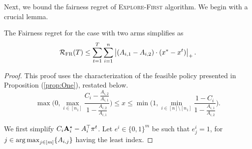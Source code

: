 Next, we bound the fairness regret of \textsc{Explore-First} algorithm. We begin with a crucial lemma.
\begin{lemma}\label{fairness-reform}
The Fairness regret for the case with two arms simplifies as \begin{equation}
\mathcal{R}_\textsc{FR}(T) \leq \sum_{t=1}^T\sum_{i=1}^n \left|(A_{i,1}-A_{i,2})\cdot (x^*-x^t)\right|_+.
\end{equation}
\end{lemma}
\begin{proof}
This proof uses the characterization of the feasible policy presented in Proposition (\ref{prop:One}), restated below.
\begin{equation}
    \max \Bigg( 0,  \max_{i \in [n_1]}\frac{C_i - \frac{A_{i,2}}{A_{i,1}}}{ 1 - \frac{A_{i,2}}{A_{i,1}}} \Bigg) \leq x \leq \min \Bigg( 1, \min_{i \in [n] \setminus [n_1]} \frac{1 - C_i}{ 1 - \frac{A_{i,1}}{A_{i,2}}} \Bigg).
    \label{feasible-x}
\end{equation}

We first simplify $C_i\mathbf{A}^{\star}_i-A_i^\top \pi^t$. Let $e^i\in \{0, 1\}^m$  be such that $e^i_j=1$, for $j\in\operatorname*{arg\,max}_{j\in[m]}\{A_{i,j}\}$ having the least index.


\end{proof}
